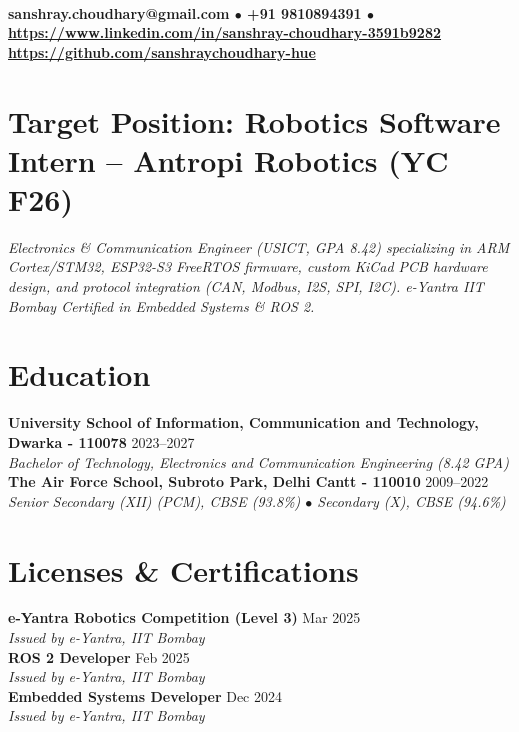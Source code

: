 \documentclass[10pt,a4paper]{article}%
\begin{document}
%
\normalsize%
 \vspace{3pt}\\%
\noindent \textbf{\scriptsize sanshray.choudhary@gmail.com $\bullet$ +91 9810894391 $\bullet$ \href{https://www.linkedin.com/in/sanshray-choudhary-3591b9282}{https://www.linkedin.com/in/sanshray-choudhary-3591b9282} \\ \href{https://github.com/sanshraychoudhary-hue}{https://github.com/sanshraychoudhary-hue}} \vspace{6pt}%

\section*{Target Position: Robotics Software Intern -- Antropi Robotics (YC F26)}%
\noindent \textit{Electronics \& Communication Engineer (USICT, GPA 8.42) specializing in ARM Cortex/STM32, ESP32-S3 FreeRTOS firmware, custom KiCad PCB hardware design, and protocol integration (CAN, Modbus, I2S, SPI, I2C). e-Yantra IIT Bombay Certified in Embedded Systems \& ROS 2.} \vspace{6pt}%

\section*{Education}%
\noindent \textbf{University School of Information, Communication and Technology, Dwarka - 110078} \hfill 2023--2027 \\%
\indent \textit{Bachelor of Technology, Electronics and Communication Engineering (8.42 GPA)} \vspace{6pt}\\%
\noindent \textbf{The Air Force School, Subroto Park, Delhi Cantt - 110010} \hfill 2009--2022 \\%
\indent \textit{Senior Secondary (XII) (PCM), CBSE (93.8\%) $\bullet$ Secondary (X), CBSE (94.6\%)} \vspace{6pt}%

\section*{Licenses \& Certifications}%
\noindent \textbf{e-Yantra Robotics Competition (Level 3)} \hfill Mar 2025 \\%
\indent \textit{Issued by e-Yantra, IIT Bombay} \vspace{4pt}\\%
\noindent \textbf{ROS 2 Developer} \hfill Feb 2025 \\%
\indent \textit{Issued by e-Yantra, IIT Bombay} \vspace{4pt}\\%
\noindent \textbf{Embedded Systems Developer} \hfill Dec 2024 \\%
\indent \textit{Issued by e-Yantra, IIT Bombay} \vspace{6pt}%
\end{document}
